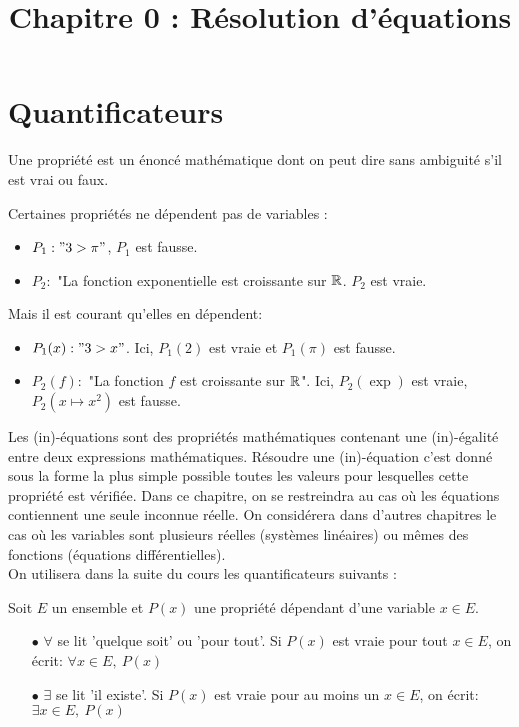 \documentclass[a4paper, 11pt]{article}
\begin{document}
   \title{Chapitre 0 : Résolution d'équations}
   \tableofcontents

\section{Quantificateurs}

\begin{defi}
Une propri\'et\'e est un \'enonc\'e math\'ematique dont on peut dire sans ambiguit\'e s'il est vrai ou faux.
\end{defi}
Certaines propriétés ne dépendent pas de variables : 
\begin{itemize}
    \item $P_1  :  " 3 > \pi" $, $P_1$ est fausse.
    \item $P_2  : $ "La fonction exponentielle est croissante sur $\mathbb{R}$. $P_2$ est vraie.
\end{itemize}

Mais il est courant qu'elles en dépendent: 
\begin{itemize}
    \item $P_1 (x) :  " 3 > x" $. Ici, $P_1(2)$  est vraie et   $P_1(\pi)$ est fausse.
    \item $P_2(f)  : $ "La fonction $f$ est croissante sur $\mathbb{R}$". Ici, $P_2(\exp)$ est vraie, $P_2(x\mapsto x^2)$ est fausse. 
\end{itemize}

Les (in)-équations sont des propriétés mathématiques contenant une (in)-égalité entre deux expressions mathématiques. Résoudre une (in)-équation c'est donné sous la forme la plus simple possible toutes les valeurs pour lesquelles cette propriété est vérifiée. Dans ce chapitre, on se restreindra au cas où les équations contiennent une seule inconnue réelle. On considérera dans d'autres chapitres le cas où les variables sont plusieurs réelles (systèmes linéaires) ou mêmes des fonctions (équations différentielles).\\


On utilisera dans la suite du cours les quantificateurs suivants : 
\begin{defi} Soit $E$ un ensemble et $P(x)$ une propri\'et\'e dépendant d'une variable $x\in E$.
\begin{itemize}
\item[$\bullet$] $\mathbf{\forall}$ se lit 'quelque soit' ou 'pour tout'. 
Si $P(x)$ est vraie pour tout $x\in E$, on \'ecrit: $\forall x\in E,\ P(x)$
\item[$\bullet$] $\mathbf{\exists}$ se lit 'il existe'.
Si $P(x)$ est vraie pour au moins un $x\in E$, on \'ecrit: $\exists x\in E,\ P(x)$
\end{itemize}
\end{defi}
\end{document}

